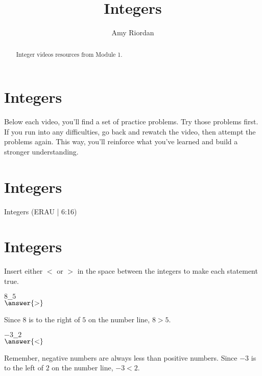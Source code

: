\documentclass{ximera}
\title{Integers}
\author{Amy Riordan}
\begin{document}
\begin{abstract}
Integer videos resources from Module 1.
\end{abstract}
\maketitle

\section*{Integers}

Below each video, you'll find a set of practice problems. Try those problems first. If you run into any difficulties, go back and rewatch the video, then attempt the problems again. This way, you'll reinforce what you’ve learned and build a stronger understanding.

\section*{Integers}

Integers (ERAU | 6:16)


\section*{Integers}


Insert either $<$ or $>$ in the space between the integers to make each statement true.

\begin{problem}
$8\_\_5$\\
$\answer{>}$

\begin{feedback}
Since $8$ is to the right of $5$ on the number line, $8 > 5$.
\end{feedback}
\end{problem}

\begin{problem}
$-3\_\_2$\\
$\answer{<}$

\begin{feedback}
Remember, negative numbers are always less than positive numbers. Since $-3$ is to the left of $2$ on the number line, $-3 < 2$.
\end{feedback}

\end{problem}
\end{document}
